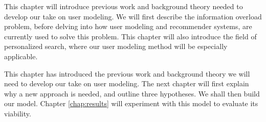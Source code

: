 \label{chap:theory}

This chapter will introduce previous work and background theory needed to develop our take on user modeling.
We will first describe the information overload problem, before delving into
how user modeling and recommender systems, are currently used to solve this problem.
This chapter will also introduce the field of personalized search, 
where our user modeling method will be especially applicable.






 
\hr

\noindent
This chapter has introduced the previous work and background theory we will need to develop our take on user modeling.
The next chapter will first explain why a new approach is needed, and outline three hypotheses.
We shall then build our model.
Chapter \ref{chap:results} will experiment with this model to evaluate its viability.


